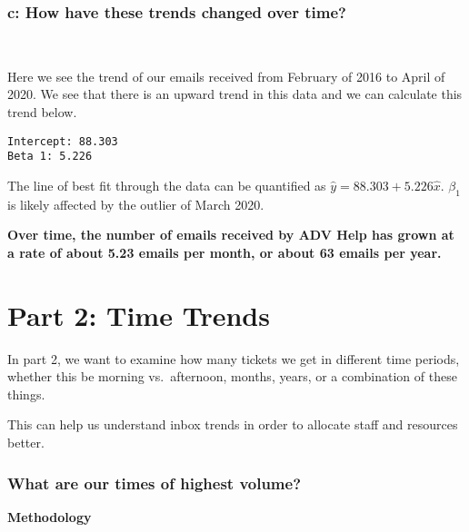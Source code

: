 \documentclass[11pt]{article}
\begin{document}
    \hypertarget{c-how-have-these-trends-changed-over-time}{%
\subsubsection{c: How have these trends changed over
time?}\label{c-how-have-these-trends-changed-over-time}}

    \begin{center}
    \end{center}
    { \hspace*{\fill} \\}
    
    Here we see the trend of our emails received from February of 2016 to
April of 2020. We see that there is an upward trend in this data and we
can calculate this trend below.


    \begin{Verbatim}[commandchars=\\\{\}]
Intercept: 88.303
Beta 1: 5.226
    \end{Verbatim}

    The line of best fit through the data can be quantified as
\(\hat{y} = 88.303 + 5.226\hat{x}\). \(\beta_1\) is likely affected by
the outlier of March 2020.

\textbf{Over time, the number of emails received by ADV Help has grown
at a rate of about 5.23 emails per month, or about 63 emails per year.}

    \hypertarget{part-2-time-trends}{%
\section{Part 2: Time Trends}\label{part-2-time-trends}}

In part 2, we want to examine how many tickets we get in different time
periods, whether this be morning vs.~afternoon, months, years, or a
combination of these things.

This can help us understand inbox trends in order to allocate staff and
resources better.

\hypertarget{what-are-our-times-of-highest-volume}{%
\subsubsection{What are our times of highest
volume?}\label{what-are-our-times-of-highest-volume}}

    \textbf{Methodology}
\end{document}
